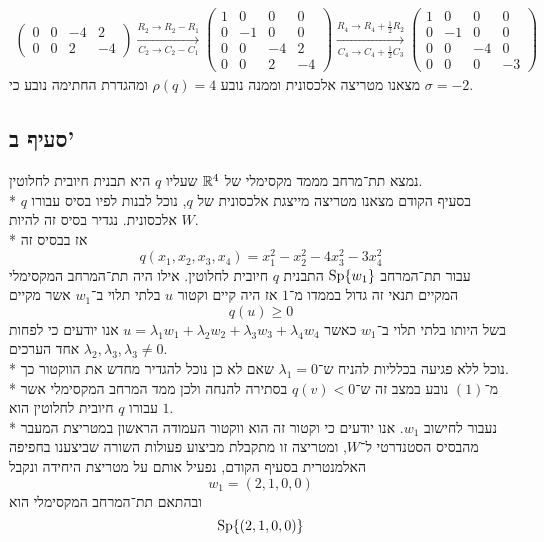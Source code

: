 \begin{align*}
\begin{pmatrix}
		0 & 0 & -4 & 2 \\
		0 & 0 & 2 & -4
	\end{pmatrix}
	\xrightarrow[C_2 \to C_2 - C_1]{R_2 \to R_2 - R_1}
	\begin{pmatrix}
		1 & 0 & 0 & 0 \\
		0 & -1 & 0 & 0 \\
		0 & 0 & -4 & 2 \\
		0 & 0 & 2 & -4
	\end{pmatrix}
	\xrightarrow[C_4 \to C_4 + \frac{1}{2}C_3]{R_4 \to R_4 + \frac{1}{2}R_2}
	\begin{pmatrix}
		1 & 0 & 0 & 0 \\
		0 & -1 & 0 & 0 \\
		0 & 0 & -4 & 0 \\
		0 & 0 & 0 & -3
	\end{pmatrix}
\end{align*}
מצאנו מטריצה אלכסונית וממנה נובע $\rho(q) = 4$ ומהגדרת החתימה נובע כי $\sigma = -2$.

\subsection{סעיף ב'}
נמצא תת־מרחב מממד מקסימלי של $\mathbb{R}^4$ שעליו $q$ היא תבנית חיובית לחלוטין. \\*
בסעיף הקודם מצאנו מטריצה מייצגת אלכסונית של $q$, נוכל לבנות לפיו בסיס עבורו $q$ אלכסונית. נגדיר בסיס זה להיות $W$. \\*
אז בבסיס זה
\[
	q(x_1, x_2, x_3, x_4) = x_1^2 - x_2^2 - 4x_3^2 - 3x_4^2 \tag{1}
\]
עבור תת־המרחב $\operatorname{Sp}\{ w_1 \}$ התבנית $q$ חיובית לחלוטין.
אילו היה תת־המרחב המקסימלי המקיים תנאי זה גדול בממדו מ־$1$ אז היה קיים וקטור $u$ בלתי תלוי ב־$w_1$ אשר מקיים
\[
	q(u) \ge 0
\]
בשל היותו בלתי תלוי ב־$w_1$ כאשר $u = \lambda_1 w_1 + \lambda_2 w_2 + \lambda_3 w_3 + \lambda_4 w_4$
אנו יודעים כי לפחות אחד הערכים $\lambda_2, \lambda_3, \lambda_3 \ne 0$. \\*
נוכל ללא פגיעה בכלליות להניח ש־$\lambda_1 = 0$ שאם לא כן נוכל להגדיר מחדש את הווקטור כך. \\*
מ־$(1)$ נובע במצב זה ש־$q(v) < 0$ בסתירה להנחה ולכן ממד המרחב המקסימלי אשר עבורו $q$ חיובית לחלוטין הוא $1$. \\*
נעבור לחישוב $w_1$. אנו יודעים כי וקטור זה הוא ווקטור העמודה הראשון במטריצת המעבר מהבסיס הסטנדרטי ל־$W$,
ומטריצה זו מתקבלת מביצוע פעולות השורה שביצענו בחפיפה האלמנטרית בסעיף הקודם, נפעיל אותם על מטריצת היחידה ונקבל
\[
	w_1 = (2, 1, 0, 0)
\]
ובהתאם תת־המרחב המקסימלי הוא
\[
	\operatorname{Sp}\{ (2, 1, 0, 0) \}
\]

